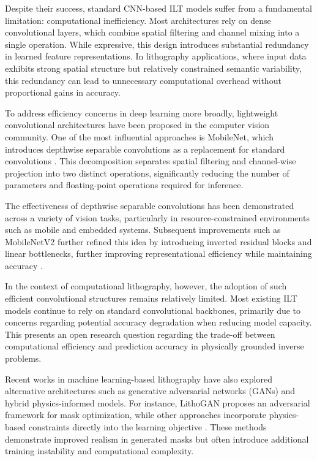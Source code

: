 \documentclass[conference]{IEEEtran}
\begin{document}
Despite their success, standard CNN-based ILT models suffer from a fundamental limitation: computational inefficiency. Most architectures rely on dense convolutional layers, which combine spatial filtering and channel mixing into a single operation. While expressive, this design introduces substantial redundancy in learned feature representations. In lithography applications, where input data exhibits strong spatial structure but relatively constrained semantic variability, this redundancy can lead to unnecessary computational overhead without proportional gains in accuracy.

To address efficiency concerns in deep learning more broadly, lightweight convolutional architectures have been proposed in the computer vision community. One of the most influential approaches is MobileNet, which introduces depthwise separable convolutions as a replacement for standard convolutions \cite{b6}. This decomposition separates spatial filtering and channel-wise projection into two distinct operations, significantly reducing the number of parameters and floating-point operations required for inference.

The effectiveness of depthwise separable convolutions has been demonstrated across a variety of vision tasks, particularly in resource-constrained environments such as mobile and embedded systems. Subsequent improvements such as MobileNetV2 further refined this idea by introducing inverted residual blocks and linear bottlenecks, further improving representational efficiency while maintaining accuracy \cite{b22}.

In the context of computational lithography, however, the adoption of such efficient convolutional structures remains relatively limited. Most existing ILT models continue to rely on standard convolutional backbones, primarily due to concerns regarding potential accuracy degradation when reducing model capacity. This presents an open research question regarding the trade-off between computational efficiency and prediction accuracy in physically grounded inverse problems.

Recent works in machine learning-based lithography have also explored alternative architectures such as generative adversarial networks (GANs) and hybrid physics-informed models. For instance, LithoGAN proposes an adversarial framework for mask optimization, while other approaches incorporate physics-based constraints directly into the learning objective \cite{b13}\cite{b18}. These methods demonstrate improved realism in generated masks but often introduce additional training instability and computational complexity.
\end{document}
